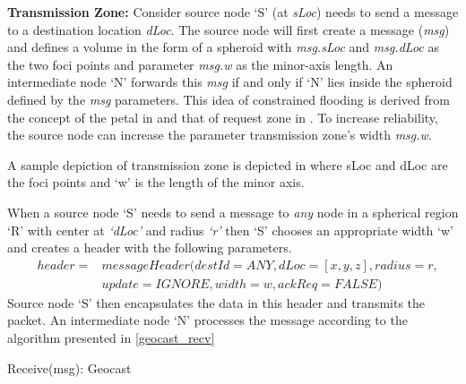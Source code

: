 \textbf{Transmission Zone:} Consider source node `S' (at \emph{sLoc}) needs to send a message to a destination location \emph{dLoc}. The source node will first create a message (\emph{msg}) and defines a volume in the form of a spheroid with \emph{msg.sLoc} and \emph{msg.dLoc} as the two foci points and parameter \emph{msg.w} as the minor-axis length. An intermediate node `N' forwards this \emph{msg} if and only if `N' lies inside the spheroid defined by the \emph{msg} parameters. This idea of constrained flooding is derived from the concept of the petal in \cite{6133499} and that of request zone in \cite{Ko:1998:LRM:288235.288252}. To increase reliability, the source node can increase the parameter transmission zone's width \emph{msg.w}.

A sample depiction of transmission zone is depicted in  where sLoc and dLoc are the foci points and `w' is the length of the minor axis.

When a source node `S' needs to send a message to \emph{any} node in a spherical region `R' with center at \emph{`dLoc'} and radius \emph{`r'} then `S' chooses an appropriate width `w' and creates a header with the following parameters.
\begin{eqnarray*}
& header = & messageHeader(destId = ANY, dLoc = [x,y,z], radius = r,\\
&    & update = IGNORE, width = w, ackReq = FALSE)
\end{eqnarray*}
Source node `S' then encapsulates the data in this header and transmits the packet. An intermediate node `N' processes the message according to the algorithm presented in \ref{geocast_recv}

\begin{algorithm}
\caption{Receive(msg): Geocast} 
\label{geocast_recv}
\DontPrintSemicolon
{}

\end{algorithm}

